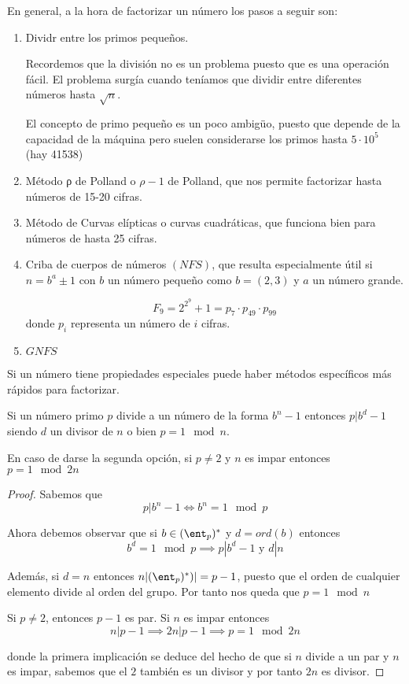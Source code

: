 En general, a la hora de factorizar un número los pasos a seguir son:
\begin{enumerate}
\item Dividr entre los primos pequeños.

Recordemos que la división no es un problema puesto que es una operación fácil. El problema surgía cuando teníamos que dividir entre diferentes números hasta $\sqrt{n}$.

El concepto de primo pequeño es un poco ambigüo, puesto que depende de la capacidad de la máquina pero suelen considerarse los primos hasta $5\cdot 10^{5}$ (hay 41538)

\item Método ρ de Polland o $ρ-1$ de Polland, que nos permite factorizar hasta números de 15-20 cifras.

\item Método de Curvas elípticas o curvas cuadráticas, que funciona bien para números de hasta 25 cifras.

\item Criba de cuerpos de números $(NFS)$, que resulta especialmente útil si $n=b^a\pm 1$ con $b$ un número pequeño como $b=(2,3)$ y $a$ un número grande.

\begin{example}
\[F_9 =2^{2^9}+1 = p_7\cdot p_{49} \cdot p_{99}\]
donde $p_i$ representa un número de $i$ cifras.
\end{example}

\item $GNFS$
\end{enumerate}

\obs Si un número tiene propiedades especiales puede haber métodos específicos más rápidos para factorizar.

\begin{prop}
Si un número primo $p$ divide a un número de la forma $b^n-1$ entonces $p|b^d-1$ siendo $d$ un divisor de $n$ o bien $p=1 \mod n$.

En caso de darse la segunda opción, si $p \neq 2$ y $n$ es impar entonces $p=1 \mod 2n$
\end{prop}
\begin{proof}
Sabemos que
\[p|b^n-1 \iff b^n =1 \mod p\]

Ahora debemos observar que si $b \in (\ent_p)^*$ y $d=ord(b)$ entonces 
\[b^d=1 \mod p \implies p|b^d-1 \text{ y } d|n\]

Además, si $d=n$ entonces $n|(\ent_p)^*)|=p-1$, puesto que el orden de cualquier elemento divide al orden del grupo. Por tanto nos queda que $p=1\mod n$

Si $p\neq 2$, entonces $p-1$ es par. Si $n$ es impar entonces 
\[n|p-1 \implies 2n|p-1 \implies p=1 \mod 2n\]

donde la primera implicación se deduce del hecho de que si $n$ divide a un par y $n$ es impar, sabemos que el $2$ también es un divisor y por tanto $2n$ es divisor.

\end{proof}

